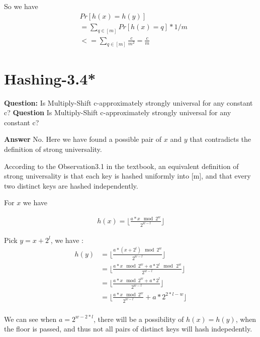 \documentclass[12pt]{article}
\begin{document}
So we have
\begin{equation}
\begin{aligned}
&Pr[h(x)=h(y)] \\
&= \sum_{q \in [m]} Pr[h(x) = q] * 1/m\\
&<=\sum_{q \in [m]}   \frac{c}{m^2}
= \frac{c}{m}
\end{aligned}
\end{equation}

\section{Hashing-3.4*}
\textbf{Question:} Is Multiply-Shift c-approximately strongly universal for any constant c?
\textbf{Question} Is Multiply-Shift c-approximately strongly universal for any constant c?

\textbf{Answer}
No. Here we have found a possible pair of $x$ and $y$ that contradicts the definition of strong universality.

According to the Observation3.1 in the textbook, an equivalent definition of strong universality is that each key is hashed uniformly into [m], and that every two distinct keys are hashed independently.

For $x$ we have 

\begin{equation}
\begin{aligned}
h(x) = \lfloor \frac{a * x \mod 2^w}{2^{w-l}} \rfloor
\end{aligned}
\end{equation}

Pick $y=x+2^{l}$, we have :
\begin{equation}
\begin{aligned}
h(y) &= \lfloor \frac{a*(x+2^l)  \mod 2^w }{2^{w-l}} \rfloor \\
&= \lfloor \frac{a*x \mod 2^w + a * 2^l \mod \, 2^w }{2^{w-l}} \rfloor \\
&= \lfloor \frac{a*x \mod 2^w + a * 2^l }{2^{w-l}} \rfloor \\
&= \lfloor \frac{a*x \mod 2^w }{2^{w-l}}  + a * 2^{2*l-w} \rfloor \\
\end{aligned}
\end{equation}

We can see when $a=2^{w-2*l}$, there will be a possibility of $h(x) = h(y)$, when the floor is passed, and thus not all pairs of distinct keys will hash indepedently.
\end{document}
